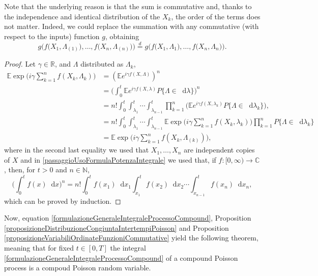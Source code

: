 \documentclass[12pt, twoside, english, headsepline]{article}
\newcommand*\dif{\mathop{}\!\mathrm{d}}  %
\newtheorem{lemma}[theorem]{Lemma}
\theoremstyle{definition} %
\numberwithin{equation}{section} %
\begin{document}
Note that the underlying reason is that the sum is commutative and, thanks to the independence and identical distribution of the $X_k$, the order of the terms does not matter. Indeed, we could replace the summation with any commutative (with respect to the inputs) function $g$, obtaining 
$$ g\Bigg(f\Big(X_1, \Lambda_{(1)}\Big),\dots, f\Big(X_n, \Lambda_{(n)}\Big) \Bigg) \stackrel{d}{=} g\Bigg(f\Big(X_1, \Lambda_{1}\Big),\dots, f\Big(X_n, \Lambda_{n}\Big) \Bigg). $$

\begin{proof}
	
	Let $\gamma\in\mathbb{R}$, and $\Lambda$ distributed as $\Lambda_k$,
	\begin{align}
		\mathbb{E} \exp\Bigg(i\gamma\sum_{k=1}^n f(X_k,\Lambda_k) \Bigg) &= \left( \mathbb{E} e^{i\gamma f(X,\Lambda) }\right)^n \nonumber\\
		& =  \Bigg( \int_0^t \mathbb{E} e^{i\gamma f(X,\lambda)}P\{\Lambda \in\dif \lambda\} \Bigg)^n \nonumber\\
		& = n! \int_0^t \int_{\lambda_1}^t \cdots \int_{\lambda_{n-1}}^t \prod_{k=1}^n \Bigg(\mathbb{E} e^{i\gamma f(X,\lambda_k)}P\{\Lambda \in\dif \lambda_k\} \Bigg), \label{passaggioUsoFormulaPotenzaIntegrale} \\
		&=  n! \int_0^t \int_{\lambda_1}^t \cdots \int_{\lambda_{n-1}}^t \mathbb{E} \exp\Big(i\gamma \sum_{k=1}^n f(X_k,\lambda_k)  \Big) \prod_{k=1}^n  P\{\Lambda \in\dif \lambda_k\} \nonumber \\
		& = \mathbb{E} \exp\Bigg(i\gamma\sum_{k=1}^n f(X_k,\Lambda_{(k)}) \Bigg),\nonumber
	\end{align}
	where in the second last equality we used that $X_1,\dots,X_n$ are independent copies of $X$ and in \eqref{passaggioUsoFormulaPotenzaIntegrale} we used that, if $f:[0,\infty)\longrightarrow \mathbb{C}$, then, for $t>0$ and $n\in\mathbb{N}$,
	\begin{equation}
		\Biggl(\int_0^t f(x)\dif x \Bigg)^n = n! \int_0^t f(x_1) \dif x_1\int_{x_1}^t f(x_2)\dif x_2 \cdots\int_{x_{n-1}}^t f(x_n)\dif x_n,
	\end{equation}
	which can be proved by induction.
	\end{proof}


Now, equation \eqref{formulazioneGeneraleIntegraleProcessoCompound}, Proposition \ref{proposizioneDistribuzioneCongiuntaIntertempiPoisson} and Proposition \ref{proposizioneVariabiliOrdinateFunzioniCommutative} yield the following theorem, meaning that for fixed $t\in[0, T]$ the integral \eqref{formulazioneGeneraleIntegraleProcessoCompound} of a compound Poisson process is a compoud Poisson random variable.
\end{document}
